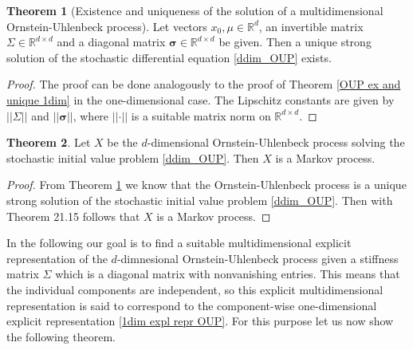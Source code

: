 \documentclass[11pt,titlepage]{article}
\newcommand{\R}{\mathbb{R}} %
\newcommand{\abs}[1]{{\left| #1 \right|}}
\theoremstyle{definition}
\newtheorem{theorem}{Theorem}[section]
\theoremstyle{remark}
\begin{document}
	\begin{theorem}[Existence and uniqueness of the solution of a multidimensional Ornstein-Uhlenbeck process]\label{multdim OUP ex and un}
		Let vectors $x_0,\mu\in\R^d$, an invertible matrix $\Sigma\in\R^{d\times d}$ and a 
		diagonal matrix $\boldsymbol{\sigma}\in\R^{d\times d}$ be given. Then a unique strong solution of the stochastic 
		differential equation \ref{ddim_OUP} exists.
	\end{theorem}

	\begin{proof}
		The proof can be done analogously to the proof of Theorem \ref{OUP ex and unique 1dim} in the one-dimensional case. The Lipschitz constants are given by $\abs{\abs{\Sigma}}$ and $\abs{\abs{\boldsymbol{\sigma}}}$, where $\abs{\abs{\cdot}}$ is 
		a suitable matrix norm on $\R^{d\times d}$.
	\end{proof}

	\begin{theorem}\label{OUP is markovian}
		Let $X$ be the $d$-dimensional Ornstein-Uhlenbeck process solving the stochastic initial value problem \ref{ddim_OUP}. Then $X$ is a Markov process.
	\end{theorem}
	
	\begin{proof}
		From Theorem \ref{multdim OUP ex and un} we know that the Ornstein-Uhlenbeck process is a 
		unique strong solution of the stochastic initial value problem \ref{ddim_OUP}. Then 
		with Theorem 21.15 \cite{Pfaffelhuber2020} follows that $X$ is a Markov process.
	\end{proof}
	
	In the following our goal is to find a suitable multidimensional explicit representation of the $d$-dimnesional Ornstein-Uhlenbeck process given a stiffness matrix $\Sigma$ which is a diagonal matrix with nonvanishing entries. This means that the individual components are independent, so this explicit multidimensional representation is said to correspond to the component-wise one-dimensional explicit representation \ref{1dim expl repr OUP}. For this purpose let us now show the following theorem.
	
\end{document}
